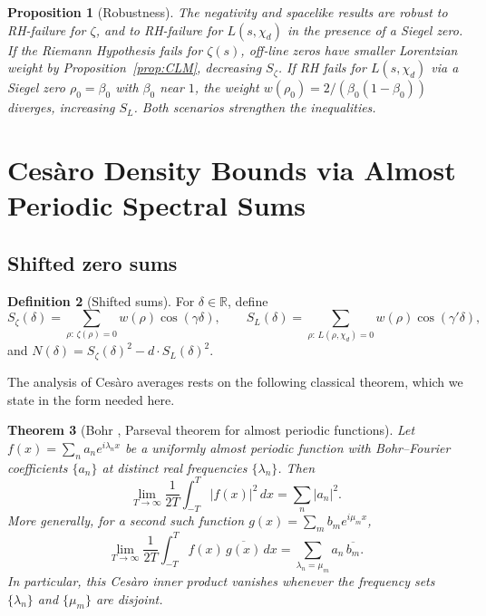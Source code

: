 \documentclass[12pt,reqno]{amsart}
\theoremstyle{plain}
\newtheorem{theorem}{Theorem}[section]
\newtheorem{proposition}[theorem]{Proposition}
\theoremstyle{definition}
\newtheorem{definition}[theorem]{Definition}
\theoremstyle{remark}
\newcommand{\R}{\mathbb{R}}
\begin{document}
\begin{proposition}[Robustness]\label{prop:robustness}
The negativity and spacelike results are robust to RH-failure for $\zeta$, and to RH-failure for $L(s,\chi_d)$ in the presence of a Siegel zero. If the Riemann Hypothesis fails for $\zeta(s)$, off-line zeros have smaller Lorentzian weight by Proposition~\ref{prop:CLM}, decreasing $S_\zeta$. If RH fails for $L(s, \chi_d)$ via a Siegel zero $\rho_0 = \beta_0$ with $\beta_0$ near $1$, the weight $w(\rho_0) = 2/(\beta_0(1-\beta_0))$ diverges, increasing $S_L$. Both scenarios strengthen the inequalities.
\end{proposition}

\section{Ces\`aro Density Bounds via Almost Periodic Spectral Sums}\label{sec:cesaro}

\subsection{Shifted zero sums}

\begin{definition}[Shifted sums]\label{def:shifted}
For $\delta \in \R$, define
\[
S_\zeta(\delta) = \sum_{\rho:\,\zeta(\rho)=0} w(\rho) \cos(\gamma\delta), \qquad
S_L(\delta) = \sum_{\rho:\,L(\rho,\chi_d)=0} w(\rho) \cos(\gamma'\delta),
\]
and $N(\delta) = S_\zeta(\delta)^2 - d \cdot S_L(\delta)^2$.
\end{definition}

The analysis of Ces\`aro averages rests on the following classical theorem, which we state in the form needed here.

\begin{theorem}[Bohr {\cite{Bohr1947}}, Parseval theorem for almost periodic functions]\label{thm:bohr-parseval}
Let $f(x) = \sum_n a_n e^{i\lambda_n x}$ be a uniformly almost periodic function with
Bohr--Fourier coefficients $\{a_n\}$ at distinct real frequencies $\{\lambda_n\}$.
Then
\[
\lim_{T \to \infty} \frac{1}{2T}\int_{-T}^{T} |f(x)|^2\,dx = \sum_n |a_n|^2.
\]
More generally, for a second such function $g(x) = \sum_m b_m e^{i\mu_m x}$,
\[
\lim_{T \to \infty} \frac{1}{2T}\int_{-T}^{T} f(x)\,\overline{g(x)}\,dx
= \sum_{\lambda_n = \mu_m} a_n\,\overline{b_m}.
\]
In particular, this Ces\`aro inner product vanishes whenever the frequency sets
$\{\lambda_n\}$ and $\{\mu_m\}$ are disjoint.
\end{theorem}
\end{document}
